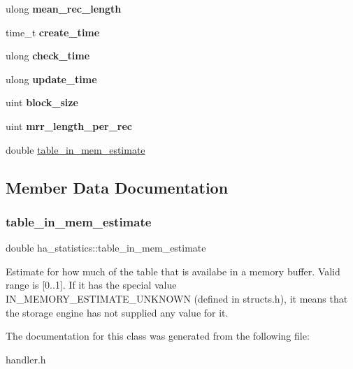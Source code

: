 \begin{DoxyCompactItemize}
ulong {\bfseries mean\+\_\+rec\+\_\+length}
\item 
\mbox{\label{classha__statistics_a582b2066b9c970f80be1b1dea10f4680}} 
time\+\_\+t {\bfseries create\+\_\+time}
\item 
\mbox{\label{classha__statistics_a4a0907ffb8f12fa537236855517aa2b2}} 
ulong {\bfseries check\+\_\+time}
\item 
\mbox{\label{classha__statistics_a246b2776517833eeae2ba1fc1233fe3b}} 
ulong {\bfseries update\+\_\+time}
\item 
\mbox{\label{classha__statistics_a100ec96759f9a9c171bc243ece377380}} 
uint {\bfseries block\+\_\+size}
\item 
\mbox{\label{classha__statistics_ab76cdae7ccf3fbdc15a118f232a32466}} 
uint {\bfseries mrr\+\_\+length\+\_\+per\+\_\+rec}
\item 
double \mbox{\hyperlink{classha__statistics_a8696f2ecbfbac43f8a03ff73f6ebc06f}{table\+\_\+in\+\_\+mem\+\_\+estimate}}
\end{DoxyCompactItemize}


\subsection{Member Data Documentation}
\mbox{\label{classha__statistics_a8696f2ecbfbac43f8a03ff73f6ebc06f}} 
\subsubsection{\texorpdfstring{table\+\_\+in\+\_\+mem\+\_\+estimate}{table\_in\_mem\_estimate}}
{\footnotesize\ttfamily double ha\+\_\+statistics\+::table\+\_\+in\+\_\+mem\+\_\+estimate}

Estimate for how much of the table that is availabe in a memory buffer. Valid range is \mbox{[}0..1\mbox{]}. If it has the special value I\+N\+\_\+\+M\+E\+M\+O\+R\+Y\+\_\+\+E\+S\+T\+I\+M\+A\+T\+E\+\_\+\+U\+N\+K\+N\+O\+WN (defined in structs.\+h), it means that the storage engine has not supplied any value for it. 

The documentation for this class was generated from the following file\+:\begin{DoxyCompactItemize}
\item 
handler.\+h\end{DoxyCompactItemize}
